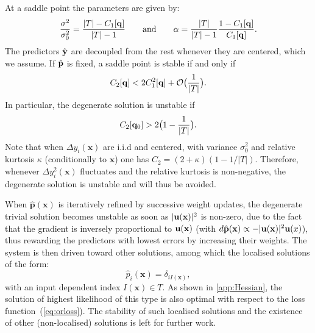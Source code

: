 %
At a saddle point the parameters are given by:
%
\[
  \frac{\sigma^2}{\sigma_0^2} = 
    \frac{\vert T\vert-C_1[{\bf q}]}{\vert T\vert-1} 
    \qquad\text{and}\qquad
    \alpha = \frac{\vert T\vert}{\vert T\vert-1}\frac{1-C_1[{\bf q}]}{C_1[{\bf q}]}.
\]
%
The predictors $\hat {\bf y}$ are decoupled from the rest whenever they are centered, which we 
assume. If $\hat {\bf p}$ is fixed, a saddle point is stable if and only if
%
\[
  C_2[{\bf q}] < 2C_1^2[{\bf q}]+{\cal O}\bigl(\frac{1}{\vert T\vert}\bigr).
\]
%
In particular, the degenerate solution is unstable if
%
\[
  C_2[{\bf q}_0] > 2\bigl(1-\frac{1}{\vert T\vert}\bigr).
\]
%
Note that when $\Delta y_i(\mathbf{x})$ are i.i.d and centered, with variance $\sigma_0^2$ and relative 
kurtosis $\kappa$ (conditionally to $\mathbf{x}$) one has $C_2 = (2+\kappa)(1-1/\vert T\vert)$. Therefore, 
whenever $\Delta y_i^2(\mathbf{x})$ fluctuates and the relative kurtosis is non-negative,
the degenerate solution is unstable and will thus be avoided.

When $\hat{\mathbf{p}}(\mathbf{x})$ is iteratively refined by successive weight updates, the degenerate 
trivial solution becomes unstable as soon as $\vert {\bf u}(\mathbf{x})\vert^2$ is non-zero, due to the fact 
that the gradient is inversely proportional to ${\bf u}(\mathbf{x})$ (with 
$d\hat{\bf p}(\mathbf{x})\propto -\vert {\bf u}(\mathbf{x})\vert^2 {\bf u}(x)$), thus rewarding the predictors with lowest 
errors by increasing their weights. The system is then driven toward other solutions, among which 
the localised solutions of the form:
% 
\[
  \hat p_i(\mathbf{x}) = \delta_{iI(\mathbf{x})},
\]
%
with an input dependent index $I(\mathbf{x})\in T$. As shown in \cref{app:Hessian}, the solution of highest 
likelihood of this type is also optimal with respect to the loss function~(\cref{eq:orloss}). The 
stability of such localised solutions and the existence of other (non-localised) solutions is left 
for further work.  


